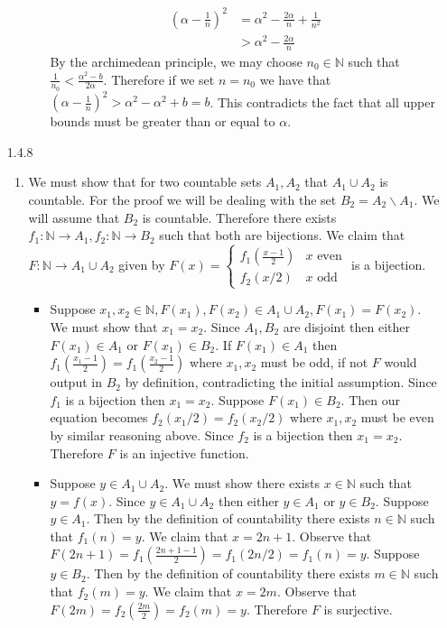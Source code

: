 \documentclass[12pt, letterpaper]{article}
\newcommand{\N}{\mathbb{N}}
\begin{document}
\begin{enumerate}
\begin{enumerate}
\begin{itemize}
			\begin{align*}
				\left( \alpha - \frac{1}{n}\right)^2
				&= \alpha^2 - \frac{2\alpha}{n} + \frac{1}{n^2}\\ 
				&>\alpha^2 - \frac{2\alpha}{n}
			\end{align*}  
			By the archimedean principle, we may choose $n_0 \in \N$ such that $\frac{1}{n_0} < \frac{\alpha^2 - b}{2 \alpha}$.  Therefore if we set $n = n_0$ we have that $\left(\alpha - \frac{1}{n}\right)^2 > \alpha^2 - \alpha^2 + b = b$.  This contradicts the fact that all upper bounds must be greater than or equal to $\alpha$.
		\end{itemize}
	\end{enumerate}
	\item[1.4.8]
		\begin{enumerate}
			\item We must show that for two countable sets $A_1, A_2$ that $A_1 \cup A_2$ is countable.  For the proof we will be dealing with the set $B_2 = A_2\backslash A_1$.  We will assume that $B_2$ is countable.  Therefore there exists $f_1 : \N \to A_1, f_2 : \N \to B_2$ such that both are bijections.  We claim that $F: \N \to A_1 \cup A_2$ given by 
			$F(x) = \begin{cases}
				f_1(\frac{x-1}{2}) & x \text{ even}\\
				f_2(x/2) & x \text{ odd}
			\end{cases}$ is a bijection.  
			\begin{itemize}
			\item	Suppose $x_1,x_2 \in \N, F(x_1), F(x_2) \in A_1 \cup A_2, F(x_1) = F(x_2)$.  We must show that $x_1 = x_2$.  Since $A_1, B_2$ are disjoint then either $F(x_1) \in A_1$ or $F(x_1) \in B_2$.  If $F(x_1) \in A_1$ then $f_1(\frac{x_1 - 1}{2}) = f_1(\frac{x_2 - 1}{2})$ where $x_1, x_2$ must be odd, if not $F$ would output in $B_2$ by definition, contradicting the initial assumption.  Since $f_1$ is a bijection then $x_1 = x_2$.  Suppose $F(x_1) \in B_2$.  Then our equation becomes $f_2(x_1/2) = f_2(x_2/2)$ where $x_1, x_2$ must be even by similar reasoning above.  Since $f_2$ is a bijection then $x_1 = x_2$.  Therefore $F$ is an injective function.
			\item Suppose $y \in A_1 \cup A_2$.  We must show there exists $x \in \N$ such that $y = f(x)$.  Since $y \in A_1 \cup A_2$ then either $y \in A_1$ or $y \in B_2$.  Suppose $y \in A_1$.  Then by the definition of countability there exists $n \in \N$ such that $f_1 (n) = y$.  We claim that $x = 2n + 1$.  Observe that $F(2n + 1) = f_1 (\frac{2n + 1 - 1}{2}) = f_1 (2n/2) = f_1 (n) = y$.  Suppose $y \in B_2$.  Then by the definition of countability there exists $m \in \N$ such that $f_2(m) = y$.  We claim that $x = 2m$.  Observe that $F(2m) = f_2 (\frac{2m}{2}) = f_2(m) = y$. Therefore $F$ is surjective.  

\end{itemize}
\end{enumerate}
\end{enumerate}
\end{document}
